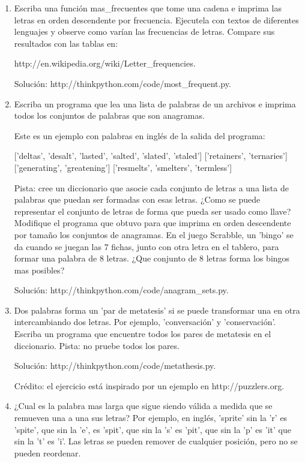 \begin{enumerate}

 \item Escriba una función mas\_frecuentes que tome una cadena e imprima las letras en orden descendente por frecuencia.
 Ejecutela con textos de diferentes lenguajes y observe como varían las frecuencias de letras. Compare sus resultados
 con las tablas en:
 
 http://en.wikipedia.org/wiki/Letter\_frequencies. 
 
 Solución: http://thinkpython.com/code/most\_frequent.py. 
  
 \item Escriba un programa que lea una lista de palabras de un archivos e imprima todos los conjuntos de palabras que 
 son anagramas.
 
 Este es un ejemplo con palabras en inglés de la salida del programa:

 ['deltas', 'desalt', 'lasted', 'salted', 'slated', 'staled']
 ['retainers', 'ternaries']
 ['generating', 'greatening']
 ['resmelts', 'smelters', 'termless']

 Pista: cree un diccionario que asocie cada conjunto de letras a una lista de palabras que puedan ser formadas con 
 esas letras. ¿Como se puede representar el conjunto de letras de forma que pueda ser usado como llave?
 Modifique el programa que obtuvo para que imprima en orden descendente por tamaño los conjuntos de anagramas.
 En el juego Scrabble, un 'bingo' se da cuando se juegan las 7 fichas, junto con otra letra en el tablero, para formar
 una palabra de 8 letras. ¿Que conjunto de 8 letras forma los bingos mas posibles? 
 
 
 Solución: http://thinkpython.com/code/anagram\_sets.py.

 \item Dos palabras forma un 'par de metatesis' si se puede transformar una en otra intercambiando dos letras. Por ejemplo,
 'conversación' y 'conservación'. Escriba un programa que encuentre todos los pares de metatesis en el diccionario. Pista: 
 no pruebe todos los pares.
 
 Solución: http://thinkpython.com/code/metathesis.py. 
 
 Crédito: el ejercicio está inspirado por un ejemplo en http://puzzlers.org.

 
 \item
 ¿Cual es la palabra mas larga que sigue siendo válida a medida que se remueven una a una sus letras?
 Por ejemplo, en inglés, 'sprite' sin la 'r' es 'spite', que sin la 'e', es 'spit', que sin la 's' es
 'pit', que sin la 'p' es 'it' que sin la 't' es 'i'. Las letras se pueden remover de cualquier posición, pero no se 
 pueden reordenar.
 

\end{enumerate}
